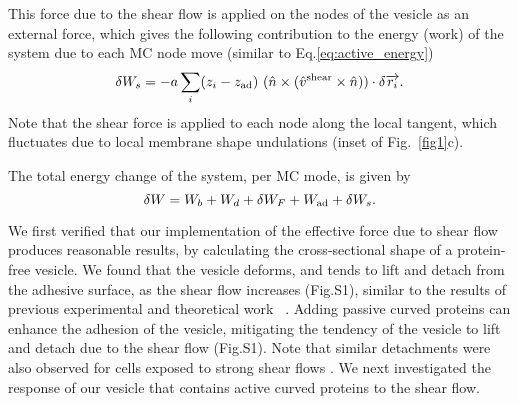 \documentclass[
reprint,
superscriptaddress,
 amsmath,amssymb,
 aps,
prl,
floatfix]{revtex4-2}
\begin{document}
This force due to the shear flow is applied on the nodes of the vesicle as an external force, which gives the following contribution to the energy (work) of the system due to each MC node move (similar to Eq.\ref{eq:active_energy})
\begin{equation}
    \delta W_{s}=-a\sum_i(z_i-z_{\rm ad})~(\hat{n}\times(\hat{v}^{\rm shear}\times \hat{n}))\cdot \delta\overrightarrow{r_i}.
    \label{eq:shear_energy}
\end{equation}
Note that the shear force is applied to each node along the local tangent, which fluctuates due to local membrane shape undulations (inset of Fig.~\ref{fig1}c).

The total energy change of the system, per MC mode, is given by
\begin{equation}
     \delta W=W_b+W_d+ \delta W_F+W_{\rm ad}+ \delta W_s.
\end{equation}

We first verified that our implementation of the effective force due to shear flow produces reasonable results, by calculating the cross-sectional shape of a protein-free vesicle. We found that the vesicle deforms, and tends to lift and detach from the adhesive surface, as the shear flow increases (Fig.S1), similar to the results of previous experimental and theoretical work ~\cite{Cantat1999a}. Adding passive curved proteins can enhance the adhesion of the vesicle, mitigating the tendency of the vesicle to lift and detach due to the shear flow (Fig.S1). Note that similar detachments were also observed for cells exposed to strong shear flows \cite{Decave2002}. We next investigated the response of our vesicle that contains active curved proteins to the shear flow.
\end{document}
